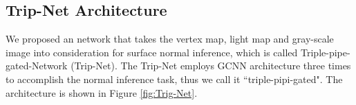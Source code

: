 %
%
%


\subsection{Trip-Net Architecture}
We proposed an network that takes the vertex map, light map and gray-scale image into consideration for surface normal inference, which is called Triple-pipe-gated-Network (Trip-Net). 
The Trip-Net employs GCNN architecture three times to accomplish the normal inference task, thus we call it ``triple-pipi-gated". The architecture is shown in Figure \ref{fig:Trig-Net}.

